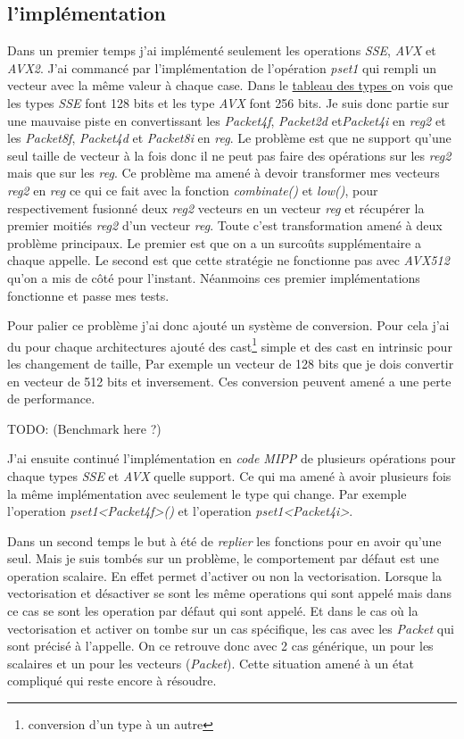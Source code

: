 \subsection{l'implémentation}

Dans un premier temps j'ai implémenté seulement les operations \emph{SSE}, \emph{AVX} et
\emph{AVX2}.
J'ai commancé par l'implémentation de l'opération \emph{pset1} qui rempli un vecteur avec
la même valeur à chaque case. Dans le \hyperref[eigenTypesTable]{tableau des types \Eigen}
on vois que les types \emph{SSE} font 128 bits et les type \emph{AVX} font 256 bits. Je
suis donc partie sur une mauvaise piste en convertissant les \emph{Packet4f},
\emph{Packet2d} et\emph{Packet4i} en \emph{reg2} et les \emph{Packet8f}, \emph{Packet4d}
et \emph{Packet8i} en \emph{reg}. Le problème est que \MIPP ne support qu'une seul taille
de vecteur à la fois donc il ne peut pas faire des opérations sur les \emph{reg2} mais
que sur les \emph{reg}. Ce problème ma amené à devoir transformer mes vecteurs \emph{reg2}
en \emph{reg} ce qui ce fait avec la fonction \emph{combinate()} et \emph{low()}, pour
respectivement fusionné deux \emph{reg2} vecteurs en un vecteur \emph{reg} et récupérer
la premier moitiés \emph{reg2} d'un vecteur \emph{reg}. Toute c'est transformation amené
à deux problème principaux. Le premier est que on a un surcoûts supplémentaire a chaque
appelle. Le second est que cette stratégie ne fonctionne pas avec \emph{AVX512} qu'on a
mis de côté pour l'instant. Néanmoins ces premier implémentations fonctionne et passe
mes tests.

Pour palier ce problème j'ai donc ajouté un système de conversion. Pour cela j'ai du pour
chaque architectures ajouté des cast\footnote{conversion d'un type à un autre} simple et
des cast en intrinsic pour les changement de taille, Par exemple un vecteur de 128 bits
que je dois convertir en vecteur de 512 bits et inversement.
Ces conversion peuvent amené a une perte de performance.

TODO: (Benchmark here ?)

J'ai ensuite continué l'implémentation en \emph{code MIPP} de plusieurs opérations pour
chaque types \emph{SSE} et \emph{AVX} quelle support. Ce qui ma amené à avoir plusieurs
fois la même implémentation \MIPP avec seulement le type qui change. Par exemple
l'operation \emph{pset1<Packet4f>()} et l'operation \emph{pset1<Packet4i>}.

Dans un second temps le but à été de \textit{replier} les fonctions pour en avoir qu'une
seul. Mais je suis tombés sur un problème, le comportement par défaut est une operation
scalaire. En effet \Eigen permet d'activer ou non la vectorisation. Lorsque la
vectorisation et désactiver se sont les même operations qui sont appelé mais dans ce cas
se sont les operation par défaut qui sont appelé. Et dans le cas où la vectorisation et
activer on tombe sur un cas spécifique, les cas avec les \emph{Packet} qui sont précisé
à l'appelle. On ce retrouve donc avec 2 cas générique, un pour les scalaires
et un pour les vecteurs (\emph{Packet}). Cette situation amené à un état compliqué qui
reste encore à résoudre.


